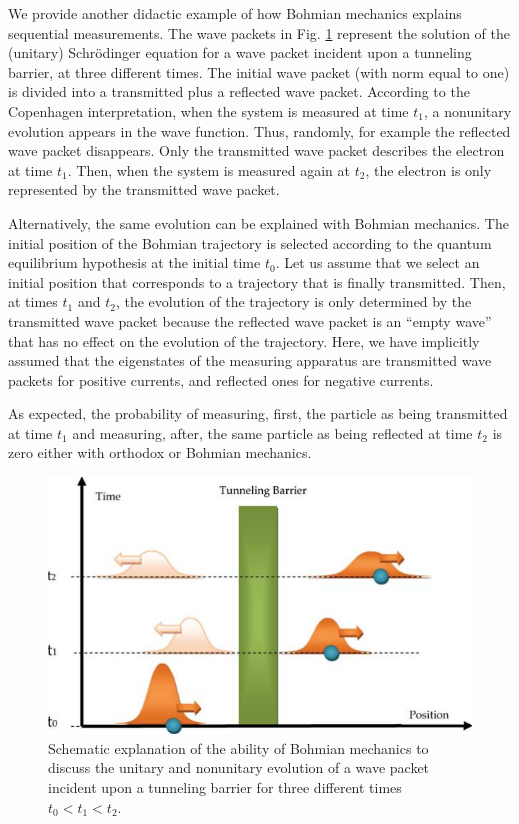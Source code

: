 \documentclass[nofootinbib, secnumarabic, amsmath, nobibnotes,11pt,aps,pra, floatfix]{revtex4-1}
\newcommand{\fref}[1]{Fig. \ref{#1}}
\begin{document}
We provide another didactic example of how Bohmian
mechanics explains sequential measurements. The wave packets in
\fref{om_sequential} represent the solution of the (unitary)
Schr\"odinger equation for a wave packet incident upon a tunneling
barrier, at three different times. The initial wave packet (with norm
equal to one) is divided into a transmitted plus a reflected wave
packet. According to the Copenhagen interpretation, when the system
is measured at time $t_1$, a nonunitary evolution appears in the
wave function. Thus, randomly, for example the reflected wave packet disappears.
Only the transmitted wave packet describes the electron at time
$t_1$. Then, when the system is measured again at $t_2$, the
electron is only represented by the transmitted wave packet.\enlargethispage{13pt}


Alternatively, the same evolution can be
explained with Bohmian mechanics. The initial position of the
Bohmian trajectory is selected according to the quantum equilibrium hypothesis at the initial time $t_0$.
Let us assume that we select an initial position that corresponds to a trajectory that is finally transmitted. Then, at times $t_1$ and $t_2$, the evolution of the trajectory is
only determined by the transmitted wave packet because the reflected wave
packet is an ``empty wave'' that has no effect on the evolution of
the trajectory.  Here, we have implicitly assumed that the
eigenstates of the measuring apparatus are transmitted wave packets
for positive currents, and reflected ones for negative currents.

As expected, the probability of measuring, first, the particle as
being transmitted at time $t_1$ and measuring, after, the same
particle as being reflected at time $t_2$ is zero either with
orthodox or Bohmian mechanics.

\begin{figure}
\centering
\includegraphics[width=0.47\columnwidth]{F1_11.pdf}
\caption{Schematic explanation of the ability of Bohmian mechanics to discuss the
unitary and nonunitary evolution of a wave packet incident upon a
tunneling barrier for three different times $t_0 < t_1 < t_2$.}
\label{om_sequential}\vspace*{-6pt}
\end{figure}
\end{document}
